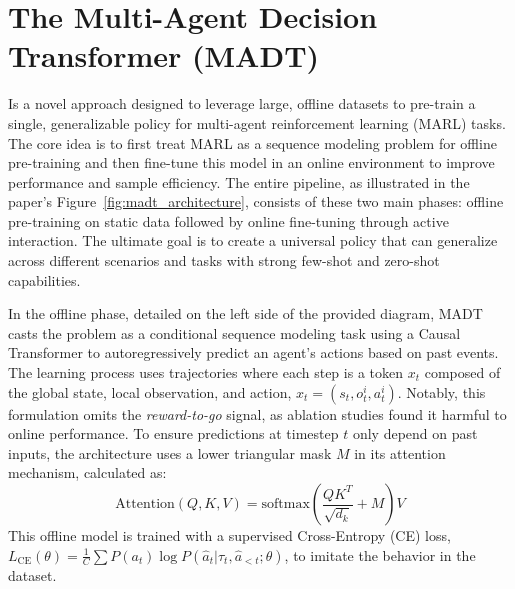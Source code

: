 \section{The Multi-Agent Decision Transformer (MADT)}
\label{sec:MADT}
  Is a novel approach designed to leverage large, offline datasets to pre-train a single, generalizable policy for multi-agent reinforcement learning (MARL) tasks. The core idea is to first treat MARL as a sequence modeling problem for offline pre-training and then fine-tune this model in an online environment to improve performance and sample efficiency. The entire pipeline, as illustrated in the paper's Figure~\ref{fig:madt_architecture}, consists of these two main phases: offline pre-training on static data followed by online fine-tuning through active interaction. The ultimate goal is to create a universal policy that can generalize across different scenarios and tasks with strong few-shot and zero-shot capabilities.

In the offline phase, detailed on the left side of the provided diagram, MADT casts the problem as a conditional sequence modeling task using a Causal Transformer to autoregressively predict an agent's actions based on past events. The learning process uses trajectories where each step is a token $x_t$ composed of the global state, local observation, and action, $x_t = (s_t, o_t^i, a_t^i)$. Notably, this formulation omits the \textit{reward-to-go} signal, as ablation studies found it harmful to online performance. To ensure predictions at timestep $t$ only depend on past inputs, the architecture uses a lower triangular mask $M$ in its attention mechanism, calculated as:
\begin{equation}
\label{eq:madt_att}
    \text{Attention}(Q,K,V) = \text{softmax}\left(\frac{QK^T}{\sqrt{d_k}} + M\right)V
\end{equation}
This offline model is trained with a supervised Cross-Entropy (CE) loss, $L_{\text{CE}}(\theta) = \frac{1}{C} \sum P(a_t) \log P(\hat{a}_t|\tau_t, \hat{a}_{<t}; \theta)$, to imitate the behavior in the dataset.

